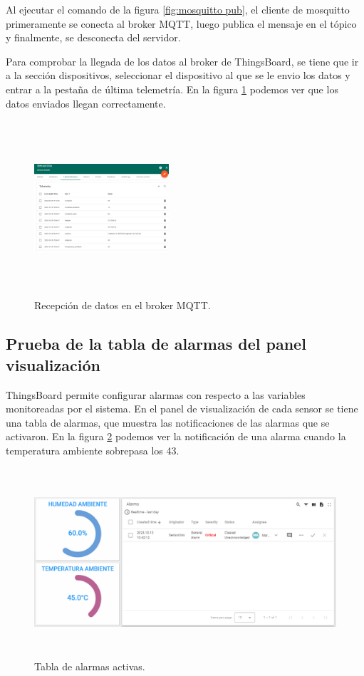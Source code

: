 Al ejecutar el comando de la figura \ref{fig:mosquitto pub}, el cliente de mosquitto primeramente se conecta al broker MQTT, luego publica el mensaje en el tópico y finalmente, se desconecta del servidor.

Para comprobar la llegada de los datos al broker de ThingsBoard, se tiene que ir a la sección dispositivos, seleccionar el dispositivo al que se le envio los datos y entrar a la pestaña de última telemetría. En la figura \ref{fig:tb recepcion} podemos ver que los datos enviados llegan correctamente.

\begin{figure}[h!]
  \centering
    \includegraphics[width=5cm, height=6.5cm]{./Figures/tb_recepcion.png}
  \caption{Recepción de datos en el broker MQTT.}
    \label{fig:tb recepcion}
\end{figure}

\subsection{Prueba de la tabla de alarmas del panel visualización}
ThingsBoard permite configurar alarmas con respecto a las variables monitoreadas por el sistema. En el panel de visualización de cada sensor se tiene una tabla de alarmas, que muestra las notificaciones de las alarmas que se activaron.
En la figura \ref{fig:alarmas tb} podemos ver la notificación de una alarma cuando la temperatura ambiente sobrepasa los 43\textcelsius.

\begin{figure}[h!]
  \centering
    \includegraphics[width=\linewidth, height=7cm]{./Figures/alarmas_tb.png}
  \caption{Tabla de alarmas activas.}
    \label{fig:alarmas tb}
\end{figure}

